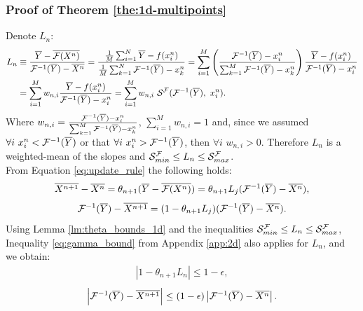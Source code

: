 \documentclass[nohyperref]{article}
\begin{document}
\subsubsection{Proof of Theorem \ref{the:1d-multipoints}}\label{app:1d-multipoints}
Denote $L_n$:
\begin{align*}
    L_n&\equiv\frac{\overline{Y}-\overline{\mathcal{F}(X^n)}}{\mathcal{F}^{-1}(\overline{Y})-\overline{X^n}}=\frac{\frac{1}{M}\sum_{i=1}^N \overline{Y}-f(x_i^n)}{\frac{1}{M}\sum_{k=1}^N \mathcal{F}^{-1}(\overline{Y})-x_k^n}=\sum_{i=1}^M \left( \frac{\mathcal{F}^{-1}(\overline{Y})-x_i^n}{\sum_{k=1}^M \mathcal{F}^{-1}(\overline{Y})-x_k^n}\right) \frac{\overline{Y}-f(x_i^n)}{\mathcal{F}^{-1}(\overline{Y})-x_i^n}\\
    &= \sum_{i=1}^M w_{n,i} \frac{\overline{Y}-f(x_i^n)}{\mathcal{F}^{-1}(\overline{Y})-x_i^n}=\sum_{i=1}^M w_{n,i}\ \mathcal{S}^{\mathcal{F}}(\mathcal{F}^{-1}(\overline{Y}),\ x_i^n).
\end{align*}
Where $w_{n,i}=\frac{\mathcal{F}^{-1}(\overline{Y})-x_i^n}{\sum_{k=1}^M \mathcal{F}^{-1}(\overline{Y})-x_k^n}$, $\sum_{i=1}^M w_{n,i}=1$ and, since we assumed $\forall i\ x_i^n<\F^{-1}(\overline{Y})$ or that $\forall i\ x_i^n>\mathcal{F}^{-1}(\overline{Y})$, then $\forall i$ $w_{n,i}>0$. Therefore $L_n$ is a weighted-mean of the slopes and  
$\mathcal{S}_{min}^{\mathcal{F}} \leq L_n \leq \mathcal{S}_{max}^{\mathcal{F}}$.\\
From Equation \ref{eq:update_rule} the following holds: 
\begin{align*}
    \overline{X^{n+1}}-\overline{X^n}=\theta_{n+1}(\overline{Y}-\overline{\mathcal{F}(X^n)})=\theta_{n+1}L_j(\mathcal{F}^{-1}(\overline{Y})-\overline{X^n}),
\end{align*}
\begin{equation}
    \mathcal{F}^{-1}(\overline{Y}) - \overline{X^{n+1}} = (1-\theta_{n+1}L_j)(\mathcal{F}^{-1}(\overline{Y})-\overline{X^n}).
\end{equation}
Using Lemma \ref{lm:theta_bounds_1d} and the inequalities $\mathcal{S}_{min}^{\mathcal{F}} \leq L_n \leq \mathcal{S}_{max}^{\mathcal{F}}$, Inequality \eqref{eq:gamma_bound} from Appendix \ref{app:2d} also applies for $L_n$, and we obtain:
\begin{align*}
        \left| 1- \theta_{n+1} L_n \right| \leq 1-\epsilon,
\end{align*}
\begin{align*}
    \left| \mathcal{F}^{-1}(\overline{Y}) - \overline{X^{n+1}} \right| \leq (1-\epsilon)\left| \mathcal{F}^{-1}(\overline{Y})- \overline{X^n} \right|.
\end{align*}
\end{document}
